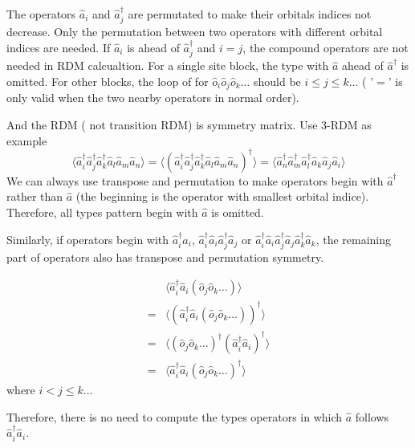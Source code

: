 The operators $\hat{a}_i$ and $\hat{a}^\dagger_j$ are permutated to make their orbitals indices not decrease. Only the permutation between two operators with different orbital indices are needed.
If $\hat{a}_i$ is ahead of $\hat{a}^\dagger_j$ and $i=j$, the compound operators are not needed in RDM calcualtion. For a single site block, the type with $\hat{a}$ ahead of $\hat{a}^\dagger$ is omitted. For other blocks, the loop of for $\hat{o}_i\hat{o}_j\hat{o}_k\dots$ should be $i \le j \le k\dots$ ( '$=$' is only valid when the two nearby operators in normal order). 


And the RDM ( not transition RDM) is symmetry matrix. Use 3-RDM as example 
\begin{equation}
  \langle \hat{a}_i^\dagger\hat{a}_j^\dagger\hat{a}^\dagger_k\hat{a}_l\hat{a}_m\hat{a}_n\rangle = \langle(\hat{a}_i^\dagger\hat{a}_j^\dagger\hat{a}^\dagger_k\hat{a}_l\hat{a}_m\hat{a}_n)^\dagger\rangle
  = \langle \hat{a}_n^\dagger\hat{a}_m^\dagger\hat{a}_l^\dagger\hat{a}_k\hat{a}_j\hat{a}_i\rangle
\end{equation}
We can always use transpose and permutation to make operators begin with $\hat{a}^\dagger$ rather than $\hat{a}$ (the beginning is the operator with smallest orbital indice). Therefore, all types pattern begin with $\hat{a}$ is omitted. 

Similarly, if operators begin with $\hat{a}^\dagger_i\hat{a}_i$, $\hat{a}^\dagger_i\hat{a}_i\hat{a}^\dagger_j\hat{a}_j$ or $\hat{a}^\dagger_i\hat{a}_i\hat{a}^\dagger_j\hat{a}_j\hat{a}^\dagger_k\hat{a}_k$, the remaining part of operators also has transpose and permutation symmetry.

\begin{equation}
\begin{aligned}
  &\langle\hat{a}^\dagger_i\hat{a}_i(\hat{o}_j \hat{o}_k\dots)\rangle \\
  = &\langle(\hat{a}^\dagger_i\hat{a}_i (\hat{o}_j \hat{o}_k\dots))^\dagger\rangle \\
  = &\langle(\hat{o}_j \hat{o}_k\dots)^\dagger(\hat{a}^\dagger_i\hat{a}_i)^\dagger\rangle \\
  = &\langle\hat{a}^\dagger_i\hat{a}_i(\hat{o}_j \hat{o}_k\dots)^\dagger\rangle
\end{aligned}
\end{equation}
where $i < j\le k\dots$

Therefore, there is no need to compute the types operators in which $\hat{a}$ follows $\hat{a}^\dagger_i\hat{a}_i$.


